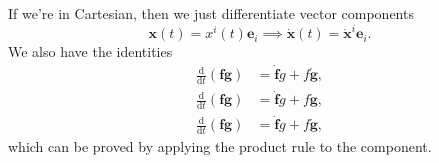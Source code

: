 If we're in Cartesian, then we just differentiate vector components
\[\mathbf{x} (t) = x^i(t)\mathbf{e} _i \implies \dot{\mathbf{x}}(t) = \dot{\mathbf{x}}^i\mathbf{e}_{i}. \]
We also have the identities
\begin{align*}
    \frac{\mathrm{d}}{\mathrm{d}t} (\mathbf{f} \mathbf{g}) &= \dot{\mathbf{f} }g + f \dot{\mathbf{g} },\\
    \frac{\mathrm{d}}{\mathrm{d}t} (\mathbf{f} \mathbf{g}) &= \dot{\mathbf{f} }g + f \dot{\mathbf{g} },\\
    \frac{\mathrm{d}}{\mathrm{d}t} (\mathbf{f} \mathbf{g}) &= \dot{\mathbf{f} }g + f \dot{\mathbf{g} },
\end{align*}
which can be proved by applying the product rule to the component.